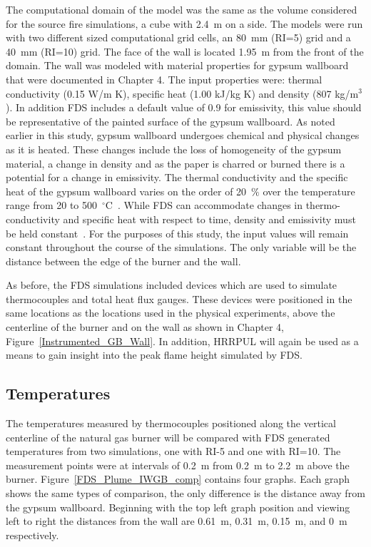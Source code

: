 \documentclass[twoside]{uocthesis}
\begin{document}
{The computational domain of the model was the same as the volume considered for the source fire simulations, a cube with 2.4~m on a side. The models were run with two different sized computational grid cells, an 80~mm (RI=5) grid and a 40~mm (RI=10) grid.  The face of the wall is located 1.95~m from the front of the domain.  
The wall was modeled with material properties for gypsum wallboard that were documented in Chapter 4.  The input properties were: thermal conductivity (0.15 W/m K), specific heat (1.00 kJ/kg K) and density (807 kg/m$^3$).  In addition FDS includes a default value of 0.9 for emissivity, this value should be representative of the painted surface of the gypsum wallboard. As noted earlier in this study, gypsum wallboard undergoes chemical and physical changes as it is heated.  These changes include the loss of homogeneity of the gypsum material, a change in density and as the paper is charred or burned there is a potential for a change in emissivity.  The thermal conductivity and the specific heat of the gypsum wallboard varies on the order of 20~$\%$ over the temperature range from 20 to 500~$^\circ$C~\cite{Gross:1985}.  While FDS can accommodate changes in thermo-conductivity and specific heat with respect to time, density and emissivity must be held constant~\cite{FDS_Users_Guide}.  For the purposes of this study, the input values will remain constant throughout the course of the simulations.  The only variable will be the distance between the edge of the burner and the wall.

As before, the FDS simulations included devices which are used to simulate thermocouples and total heat flux gauges.  These devices were positioned in the same locations as the locations used in the physical experiments, above the centerline of the burner and on the wall as shown in Chapter 4, Figure~\ref{Instrumented_GB_Wall}. In addition, HRRPUL will again be used as a means to gain insight into the peak flame height simulated by FDS.  

\subsection{Temperatures}

 The temperatures measured by thermocouples positioned along the vertical centerline of the natural gas burner will be compared with FDS generated temperatures from two simulations, one with RI-5 and one with RI=10.  The measurement points were at intervals of 0.2~m from 0.2~m to 2.2~m above the burner.  Figure~\ref{FDS_Plume_IWGB_comp} contains four graphs.  Each graph shows the same types of comparison, the only difference is the distance away from the gypsum wallboard.  Beginning with the top left graph position and viewing left to right the distances from the wall are 0.61~m, 0.31~m, 0.15~m, and 0~m respectively.  

}
\end{document}
